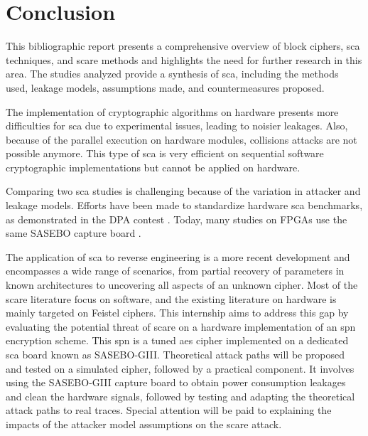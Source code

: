 \documentclass[11pt]{sdm}
\begin{document}



\section{Conclusion}

This bibliographic report presents a comprehensive overview of block ciphers, \gls{sca} techniques, and \gls{scare} methods and highlights the need for further research in this area.
The studies analyzed provide a synthesis of \gls{sca}, including the methods used, leakage models, assumptions made, and countermeasures proposed.

The implementation of cryptographic algorithms on hardware presents more difficulties for \gls{sca} due to experimental issues, leading to noisier leakages.
Also, because of the parallel execution on hardware modules, collisions attacks are not possible anymore.
This type of \gls{sca} is very efficient on sequential software cryptographic implementations but cannot be applied on hardware.

Comparing two \gls{sca} studies is challenging because of the variation in attacker and leakage models.  
Efforts have been made to standardize hardware \gls{sca} benchmarks, as demonstrated in the DPA contest \parencite{Clavier_Danger_Duc_Elaabid_Gérard_Guilley_Heuser_Kasper_Li_Lomné_et_al_2014}.
Today, many studies on FPGAs use the same SASEBO capture board \parencite{Satoh}.

The application of \gls{sca} to reverse engineering is a more recent development and encompasses a wide range of scenarios, from partial recovery of parameters in known architectures to uncovering all aspects of an unknown cipher.
Most of the \gls{scare} literature focus on software, and the existing literature on hardware is mainly targeted on Feistel ciphers.
This internship aims to address this gap by evaluating the potential threat of \gls{scare} on a hardware implementation of an \gls{spn} encryption scheme.
This \gls{spn} is a tuned \gls{aes} cipher implemented on a dedicated \gls{sca} board known as SASEBO-GIII.
Theoretical attack paths will be proposed and tested on a simulated cipher, followed by a practical component.
It involves using the SASEBO-GIII capture board to obtain power consumption leakages and clean the hardware signals, followed by testing and adapting the theoretical attack paths to real traces.
Special attention will be paid to explaining the impacts of the attacker model assumptions on the \gls{scare} attack.





\printbibliography[title=Bibliographie]
\end{document}
